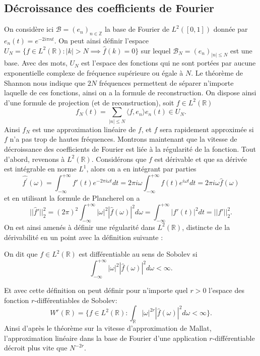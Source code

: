 \subsection{Décroissance des coefficients de Fourier}
On considère ici $\mathcal{B} = (e_{n})_{n \in \mathbb{Z}}$ la base de Fourier de $L^2([0,1])$ donnée par $e_n(t) = e^{-2i\pi nt}$.
On peut ainsi définir l'espace $U_N = \{f \in L^2(\mathbb{R}) : |k| > N \implies \hat{f}(k) = 0\}$ sur lequel $\mathcal{B}_N = (e_{n})_{|n|\leq N}$ est une base. 
Avec des mots, $U_N$ est l'espace des fonctions qui ne sont portées par aucune exponentielle complexe de fréquence supérieure ou égale à $N$.
Le théorème de Shannon nous indique que $2N$ fréquences permettent de séparer n'importe laquelle de ces fonctions, ainsi on  a la formule de reconstruction.
On dispose ainsi d'une formule de projection (et de reconstruction), soit $f \in L^2(\mathbb{R})$
\begin{equation}
	f_N(t) = \sum_{|n|\leq N} \langle f, e_n \rangle e_n(t) \in U_N.
\end{equation}
Ainsi $f_N$ est une approximation linéaire de $f$, et $f$ sera rapidement approximée si $f$ n'a pas trop de hautes fréquences. 
Montrons maintenant que la vitesse de décroissance des coefficients de Fourier est liée à la régularité de la fonction.
Tout d'abord, revenons à $L^2(\mathbb{R})$.
Considérons que $f$ est dérivable et que sa dérivée est intégrable en norme $L^1$, alors on a en intégrant par parties
\begin{equation}
	\widehat{f^\prime}(\omega) = \int_{-\infty}^{+\infty} f'(t) e^{-2\pi i \omega t} dt = 2\pi i \omega \int_{-\infty}^{+\infty} f(t) e^{i\omega t} dt = 2\pi i \omega \hat{f}(\omega) 
\end{equation}
et en utilisant la formule de Plancherel on a 
\begin{equation}
	||\hat{f}'||_2^2 = (2\pi)^2\int_{-\infty}^{+\infty} |\omega|^2 |\hat{f}(\omega)|^2 d\omega = \int_{-\infty}^{+\infty} |f'(t)|^2 dt = ||f'||_2^2.
\end{equation}
On est ainsi amenés à définir une régularité dans $L^2(\mathbb{R})$, distincte de la dérivabilité en un point avec la définition suivante :
\begin{definition}
	On dit que $f\in L^2(\mathbb{R})$ est différentiable au sens de Sobolev si
	\begin{equation*}
		\int_{-\infty}^{+\infty} |\omega|^2|\hat{f}(\omega)|^2 d\omega < \infty. 
	\end{equation*}
\end{definition}
Et avec cette définition on peut définir pour n'importe quel $r>0$ l'espace des fonction $r$-différentiables de Sobolev:
\begin{equation}
	W^r(\mathbb{R}) =\{ f \in L^2(\mathbb{R}) : \int_{\mathbb{R}} |\omega|^{2r} |\hat{f}(\omega)|^2 d\omega < \infty \}.
\end{equation}
Ainsi d'après le théorème sur la vitesse d'approximation de Mallat, l'approximation linéaire dans la base de Fourier d'une application $r$-différentiable décroit plus vite que $N^{-2r}$.
